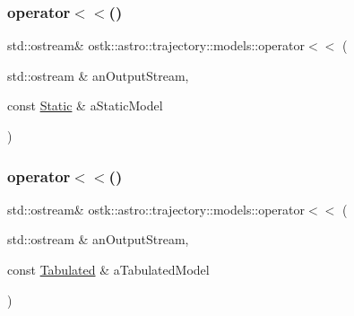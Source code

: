 \subsubsection{\texorpdfstring{operator$<$$<$()}{operator<<()}\hspace{0.1cm}{\footnotesize\ttfamily [1/2]}}
{\footnotesize\ttfamily std\+::ostream\& ostk\+::astro\+::trajectory\+::models\+::operator$<$$<$ (\begin{DoxyParamCaption}\item[{std\+::ostream \&}]{an\+Output\+Stream,  }\item[{const \hyperlink{classostk_1_1astro_1_1trajectory_1_1models_1_1_static}{Static} \&}]{a\+Static\+Model }\end{DoxyParamCaption})}

\mbox{\label{namespaceostk_1_1astro_1_1trajectory_1_1models_a933b83adb88de6c966eee5d228d8a31c}} 
\subsubsection{\texorpdfstring{operator$<$$<$()}{operator<<()}\hspace{0.1cm}{\footnotesize\ttfamily [2/2]}}
{\footnotesize\ttfamily std\+::ostream\& ostk\+::astro\+::trajectory\+::models\+::operator$<$$<$ (\begin{DoxyParamCaption}\item[{std\+::ostream \&}]{an\+Output\+Stream,  }\item[{const \hyperlink{classostk_1_1astro_1_1trajectory_1_1models_1_1_tabulated}{Tabulated} \&}]{a\+Tabulated\+Model }\end{DoxyParamCaption})}

